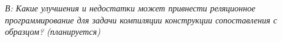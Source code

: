 \emph{В: Какие улучшения и недостатки может привнести реляционное программирование для задачи компиляции конструкции сопоставления с образцом? (планируется)}


{\influence}
%


    
    

{\reliability}


